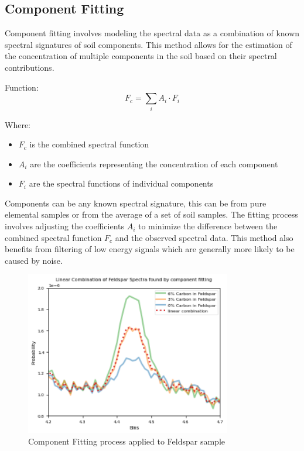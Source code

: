 \documentclass[review]{elsarticle}
\begin{document}
\subsection{Component Fitting}

Component fitting involves modeling the spectral data as a combination of known spectral signatures of soil components. This method allows for the estimation of the concentration of multiple components in the soil based on their spectral contributions.

Function: 
\begin{equation}
F_c = \sum_i A_i \cdot F_i
\end{equation}

Where:
\begin{itemize}
\item $F_c$ is the combined spectral function
\item $A_i$ are the coefficients representing the concentration of each component
\item $F_i$ are the spectral functions of individual components
\end{itemize}

Components can be any known spectral signature, this can be from pure elemental samples or from the average of a set of soil samples. The fitting process involves adjusting the coefficients $A_i$ to minimize the difference between the combined spectral function $F_c$ and the observed spectral data. This method also benefits from filtering of low energy signals which are generally more likely to be caused by noise.

\begin{figure}[H]
\centering
\includegraphics[width=0.8\textwidth]{../Figures/Analysis/linear_combination_feldspar.png}
\caption{Component Fitting process applied to Feldspar sample}
\label{fig:component_fitting}
\end{figure}
\end{document}
